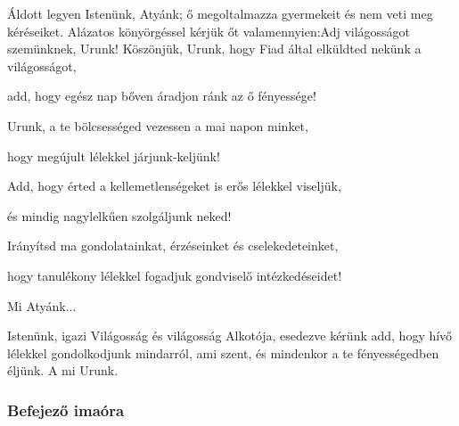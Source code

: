 \documentclass[twoside]{article}
\begin{document}






\begin{preces}{Áldott legyen Istenünk, Atyánk; ő megoltalmazza gyermekeit és nem veti meg kéréseiket. Alázatos könyörgéssel kérjük őt valamennyien:}{Adj világosságot szemünknek, Urunk!}
  Köszönjük, Urunk, hogy Fiad által elküldted nekünk a világosságot,

  \reddash add, hogy egész nap bőven áradjon ránk az ő fényessége!

  Urunk, a te bölcsességed vezessen a mai napon minket,

  \reddash hogy megújult lélekkel járjunk-keljünk!

  Add, hogy érted a kellemetlenségeket is erős lélekkel viseljük,

  \reddash és mindig nagylelkűen szolgáljunk neked!

  Irányítsd ma gondolatainkat, érzéseinket és cselekedeteinket,

  \reddash hogy tanulékony lélekkel fogadjuk gondviselő intézkedéseidet!
\end{preces}
Mi Atyánk...


Istenünk, igazi Világosság és világosság Alkotója, esedezve kérünk add, hogy hívő lélekkel gondolkodjunk mindarról, ami szent, és mindenkor a te fényességedben éljünk. A mi Urunk.

\label{f5/Compl}

\subsubsection*{Befejező imaóra}



\end{document}
